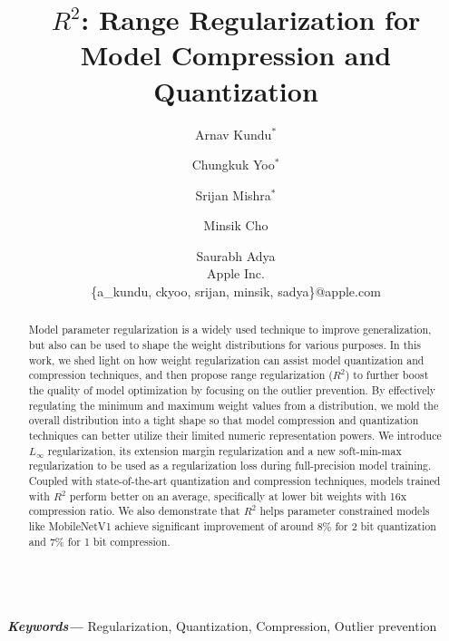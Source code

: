 \documentclass[10pt,twocolumn,letterpaper]{article}
\providecommand{\keywords}[1]
{
  \small	
  \textbf{\textit{Keywords---}} #1
}
\begin{document}
\title{$R^2$: Range Regularization for Model Compression and Quantization}

\author{Arnav Kundu$^*$
\and
Chungkuk Yoo$^*$
\and
Srijan Mishra$^*$
\and
Minsik Cho
\and
Saurabh Adya\\
Apple Inc.\\
\{a\_kundu, ckyoo, srijan, minsik, sadya\}@apple.com
}

\maketitle
\vspace{0.3in}
\begin{abstract}Model parameter regularization is a widely used technique to improve generalization, but also can be used to shape the weight distributions for various purposes. In this work, we shed light on how weight regularization can assist model quantization and compression techniques, and then propose range regularization ($R^2$) to further boost the quality of model optimization by focusing on the outlier prevention.
By effectively regulating the minimum and maximum weight values from a distribution, we mold the overall distribution into a tight shape so that model compression and quantization techniques can better utilize their limited numeric representation powers. We introduce $L_\infty$ regularization, its extension margin regularization and a new soft-min-max regularization to be used as a regularization loss during full-precision model training. Coupled with state-of-the-art quantization and compression techniques, models trained with $R^2$ perform better on an average, specifically at lower bit weights with 16x compression ratio. We also demonstrate that $R^2$ helps parameter constrained models like MobileNetV1 achieve significant improvement of around 8\% for 2 bit quantization and 7\% for 1 bit compression.
\end{abstract}\\
\keywords{Regularization, Quantization, Compression, Outlier prevention}
\end{document}
